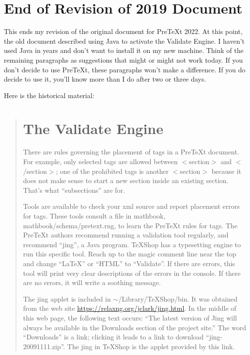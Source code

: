 \documentclass[11pt, oneside]{article}   	%
\begin{document}
\section{End of Revision of 2019 Document}

This ends my revision of the original document for PreTeXt 2022. At this point, the old document described using Java to activate the Validate Engine. I haven't used Java in years and don't want to install it on my new machine. Think of the remaining paragraphs as suggestions that might or might not work today. If you don't decide to use PreTeXt, these paragraphs won't make a difference. If you do decide to use it, you'll know more than I do after two or three days. 

\newpage

Here is the historical material:
\begin{quotation}

\section{\label{validate}The Validate Engine}

There are  rules governing the placement of tags in a PreTeXt document. For example, only selected tags are allowed between $<$section$>$ and $<$/section$>$; one of the prohibited tags is another $<$section$>$ because it does not make sense to start a new section inside an existing section. That's what ``subsections'' are for.

Tools are available to check your xml source and report placement errors for tags. These tools consult a file in mathbook, mathbook/schema/pretext.rng, to learn the PreTeXt rules for tags.  The PreTeXt authors recommend running a validation tool regularly, and recommend ``jing'', a Java program.   TeXShop has a typesetting engine to run this specific tool. Reach up to the magic comment line near the top and change ``LaTeX'' or ``HTML'' to ``Validate''. If there are errors, this tool will print very clear descriptions of the errors in the console. If there are no errors, it will write a  soothing message.

The jing applet is included in $\sim$/Library/TeXShop/bin. It was obtained from the web site  \url{https://relaxng.org/jclark/jing.html}. In the middle of this web page, the following text occurs: ``The latest version of Jing will always be available in the Downloads section of the project site.'' The word ``Downloads'' is a link; clicking it leads to a link to download ``jing-20091111.zip''. The jing in TeXShop is the applet provided by this link.


\end{quotation}
\end{document}

